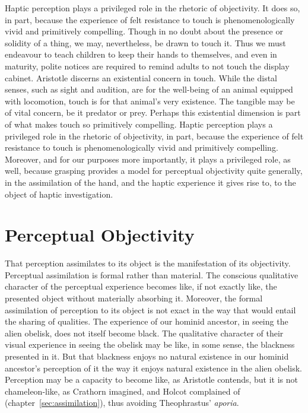 Haptic perception plays a privileged role in the rhetoric of objectivity. It does so, in part, because the experience of felt resistance to touch is phenomenologically vivid and primitively compelling. Though in no doubt about the presence or solidity of a thing, we may, nevertheless, be drawn to touch it. Thus we must endeavour to teach children to keep their hands to themselves, and even in maturity, polite notices are required to remind adults to not touch the display cabinet. Aristotle discerns an existential concern in touch. While the distal senses, such as sight and audition, are for the well-being of an animal equipped with locomotion, touch is for that animal's very existence. The tangible may be of vital concern, be it predator or prey. Perhaps this existential dimension is part of what makes touch so primitively compelling. Haptic perception plays a privileged role in the rhetoric of objectivity, in part, because the experience of felt resistance to touch is phenomenologically vivid and primitively compelling. Moreover, and for our purposes more importantly, it plays a privileged role, as well, because grasping provides a model for perceptual objectivity quite generally, in the assimilation of the hand, and the haptic experience it gives rise to, to the object of haptic investigation.


\section{Perceptual Objectivity} %
\label{sec:perceptual_objectivity}

That perception assimilates to its object is the manifestation of its objectivity. Perceptual assimilation is formal rather than material. The conscious qualitative character of the perceptual experience becomes like, if not exactly like, the presented object without materially absorbing it. Moreover, the formal assimilation of perception to its object is not exact in the way that would entail the sharing of qualities. The experience of our hominid ancestor, in seeing the alien obelisk, does not itself become black. The qualitative character of their visual experience in seeing the obelisk may be like, in some sense, the blackness presented in it. But that blackness enjoys no natural existence in our hominid ancestor's perception of it the way it enjoys natural existence in the alien obelisk. Perception may be a capacity to become like, as Aristotle contends, but it is not chameleon-like, as Crathorn imagined, and Holcot complained of (chapter~\ref{sec:assimilation}), thus avoiding Theophrastus' \emph{aporia}. 

